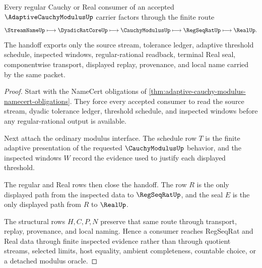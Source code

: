 \begin{theorem}
\label{thm:adaptive-cauchy-modulus-regseqrat-handoff}
Every regular Cauchy or Real consumer of an accepted $\AdaptiveCauchyModulusUp$ carrier factors through the finite route
$$
\StreamNameUp
\longmapsto
\DyadicRatCoreUp
\longmapsto
\CauchyModulusUp
\longmapsto
\RegSeqRatUp
\longmapsto
\RealUp .
$$
The handoff exports only the source stream, tolerance ledger, adaptive threshold schedule, inspected windows, regular-rational readback, terminal Real seal, componentwise transport, displayed replay, provenance, and local name carried by the same packet.
\end{theorem}
\begin{proof}
Start with the NameCert obligations of \autoref{thm:adaptive-cauchy-modulus-namecert-obligations}. They force every accepted consumer to read the source stream, dyadic tolerance ledger, threshold schedule, and inspected windows before any regular-rational output is available.

Next attach the ordinary modulus interface. The schedule row $T$ is the finite adaptive presentation of the requested $\CauchyModulusUp$ behavior, and the inspected windows $W$ record the evidence used to justify each displayed threshold.

The regular and Real rows then close the handoff. The row $R$ is the only displayed path from the inspected data to $\RegSeqRatUp$, and the seal $E$ is the only displayed path from $R$ to $\RealUp$.

The structural rows $H,C,P,N$ preserve that same route through transport, replay, provenance, and local naming. Hence a consumer reaches RegSeqRat and Real data through finite inspected evidence rather than through quotient streams, selected limits, host equality, ambient completeness, countable choice, or a detached modulus oracle.
\end{proof}


\begin{closurestatus}{\AdaptiveCauchyModulusUp}
  \theoryclosure{\seedClosure}
  \formalstatus{\unformalizedV}
\end{closurestatus}
